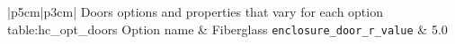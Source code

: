 \begin{customLongTable}{ |p{5cm}|p{3cm}| }
{Doors options and properties that vary for each option} {table:hc_opt_doors}
{Option name & Fiberglass}
\endhead
\hline
\texttt{enclosure\_door\_r\_value} & 5.0 \\
\end{customLongTable}
